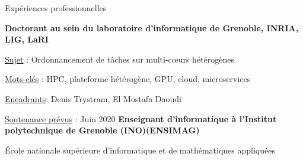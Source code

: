 \begin{rubric}{Expériences professionnelles}



    \textbf{Doctorant au sein du laboratoire d'informatique de Grenoble, INRIA, LIG, LaRI}
    \hfill {} 
    \par \underline{Sujet} : Ordonnancement de tâches sur multi-cœurs hétérogènes
    \par \underline{Mots-clés} : HPC, plateforme hétérogène, GPU, cloud, microservices 
    \par \underline{Encadrants}: Denis Trystram, El Mostafa Daoudi
    \par \underline{Soutenance prévus} : Juin 2020
%
%
    \entry*[$2019 - 2020$] \textbf{Enseignant d'informatique à l'Institut polytechnique de Grenoble (INO)(ENSIMAG)} 
     \hfill{} 
    \par École nationale supérieure d'informatique et de mathématiques appliquées 


\end{rubric}
